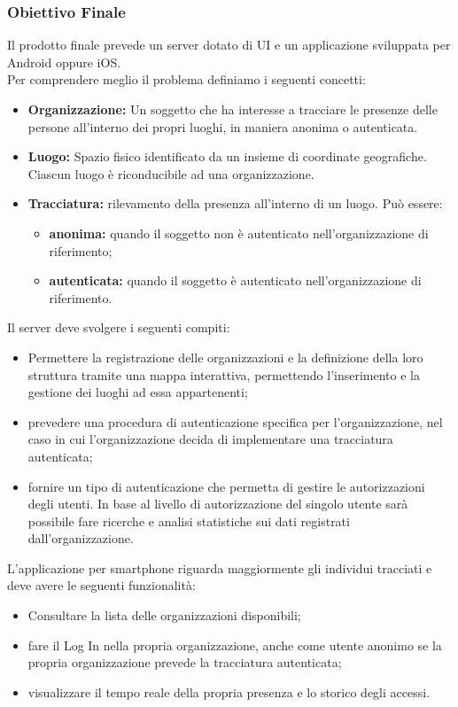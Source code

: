 	\subsubsection{Obiettivo Finale}
	Il prodotto finale prevede un server dotato di UI e un applicazione sviluppata per Android oppure iOS.\\
	Per comprendere meglio il problema definiamo i seguenti concetti:
	\begin{itemize}
		\item \textbf{Organizzazione:} Un soggetto che ha interesse a tracciare le presenze delle persone all'interno dei propri luoghi, in maniera anonima o autenticata.
		\item \textbf{Luogo:} Spazio fisico identificato da un insieme di coordinate geografiche. Ciascun luogo è riconducibile ad una organizzazione. 
		\item \textbf{Tracciatura:}  rilevamento della presenza all'interno di un luogo. Può essere:
		\begin{itemize}
			\item \textbf{anonima:} quando il soggetto non è autenticato nell'organizzazione di riferimento;
			\item \textbf{autenticata:} quando il soggetto è autenticato nell'organizzazione di riferimento.
		\end{itemize}
	\end{itemize}
	Il server deve svolgere i seguenti compiti:
	\begin{itemize}
		\item Permettere la registrazione delle organizzazioni e la definizione della loro struttura tramite una mappa interattiva, permettendo l'inserimento e la gestione dei luoghi ad essa appartenenti; 
		\item prevedere una procedura di autenticazione specifica per l'organizzazione, nel caso in cui l'organizzazione decida di implementare una tracciatura autenticata;
		\item fornire un tipo di autenticazione che permetta di gestire le autorizzazioni degli utenti. In base al livello di autorizzazione del singolo utente sarà possibile fare ricerche e analisi statistiche sui dati registrati dall'organizzazione.
	\end{itemize}
	L'applicazione per smartphone riguarda maggiormente gli individui tracciati e deve avere le seguenti funzionalità:
	\begin{itemize}
		\item Consultare la lista delle organizzazioni disponibili; 
		\item fare il Log In nella propria organizzazione, anche come utente anonimo se la propria organizzazione prevede la tracciatura autenticata; 
		\item visualizzare il tempo reale della propria presenza e lo storico degli accessi.
	\end{itemize}
